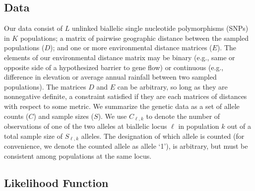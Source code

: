 \subsection*{Data}

Our data consist of $L$ unlinked biallelic single nucleotide polymorphisms (SNPs) in $K$ populations; a matrix of pairwise geographic distance between the sampled populations ($D$); and one or more environmental distance matrices ($E$).  
The elements of our environmental distance matrix may be binary (e.g., same or opposite side of a hypothesized barrier to gene flow) or continuous (e.g., difference in elevation or average annual rainfall between two sampled populations).  
The matrices $D$ and $E$ can be arbitrary, so long as they are nonnegative definite, a constraint satisfied if they are each matrices of distances with respect to some metric.  
We summarize the genetic data as a set of allele counts ($C$) and sample sizes ($S$).  We use $C_{\ell,k}$ to denote the number of observations of one of the two alleles at biallelic locus $\ell$ in population $k$ out of a total sample size of $S_{\ell,k}$ alleles.  The designation of which allele is counted (for convenience, we denote the counted allele as  allele `1'), is arbitrary, but must be consistent among populations at the same locus.

\subsection*{Likelihood Function}

